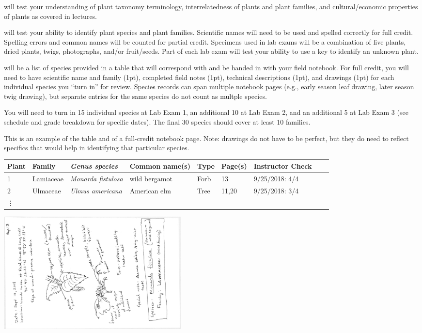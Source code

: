 \documentclass{tufte-handout}
\begin{document}
\begin{fullwidth}

 will test your understanding of plant taxonomy terminology, interrelatedness of plants and plant families, and cultural/economic properties of plants as covered in lectures. 

 will test your ability to identify plant species and plant families. Scientific names will need to be used and spelled correctly for full credit. Spelling errors and common names will be counted for partial credit. Specimens used in lab exams will be a combination of live plants, dried plants, twigs, photographs, and/or fruit/seeds. Part of each lab exam will test your ability to use a key to identify an unknown plant.

 will be a list of species provided in a table that will correspond with and be handed in with your field notebook.  For full credit, you will need to have scientific name and family (1pt), completed field notes (1pt), technical descriptions (1pt), and drawings (1pt) for each individual species you ``turn in'' for review. Species records can span multiple notebook pages (e.g., early season leaf drawing, later season twig drawing), but separate entries for the same species do not count as multple species. 

You will need to turn in 15 individual species at Lab Exam 1, an additional 10 at Lab Exam 2, and an additional 5 at Lab Exam 3 (see schedule and grade breakdown for specific dates). The final 30 species should cover at least 10 families.

This is an example of the table and of a full-credit notebook page. Note: drawings do not have to be perfect, but they do need to reflect specifics that would help in identifying that particular species. 

\begin{tabular}{lllllllll}
\hline
Plant & Family & \emph{Genus species} & Common name(s) & Type & Page(s) & Instructor Check & \\
\hline
1 & Lamiaceae & \emph{Monarda fistulosa} & wild bergamot & Forb & 13 & 9/25/2018: 4/4 \\
2 & Ulmaceae & \emph{Ulmus americana} & American elm & Tree & 11,20 & 9/25/2018: 3/4 \\
\vdots \\
\hline
\end{tabular}

\includegraphics[width=3.8in,angle=90]{example_notebook.jpg}


\end{fullwidth}
\end{document}
